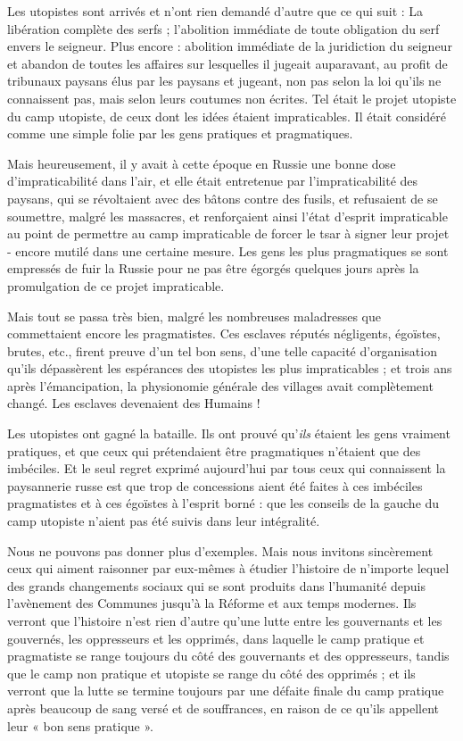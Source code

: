 Les utopistes sont arrivés et n'ont rien demandé d'autre que ce qui suit : La libération complète des serfs ; l'abolition immédiate de toute obligation du serf envers le seigneur. Plus encore : abolition immédiate de la juridiction du seigneur et abandon de toutes les affaires sur lesquelles il jugeait auparavant, au profit de tribunaux paysans élus par les paysans et jugeant, non pas selon la loi qu'ils ne connaissent pas, mais selon leurs coutumes non écrites. Tel était le projet utopiste du camp utopiste, de ceux dont les idées étaient impraticables. Il était considéré comme une simple folie par les gens pratiques et pragmatiques.

Mais heureusement, il y avait à cette époque en Russie une bonne dose d'impraticabilité dans l'air, et elle était entretenue par l'impraticabilité des paysans, qui se révoltaient avec des bâtons contre des fusils, et refusaient de se soumettre, malgré les massacres, et renforçaient ainsi l'état d'esprit impraticable au point de permettre au camp impraticable de forcer le tsar à signer leur projet - encore mutilé dans une certaine mesure. Les gens les plus pragmatiques se sont empressés de fuir la Russie pour ne pas être égorgés quelques jours après la promulgation de ce projet impraticable.

Mais tout se passa très bien, malgré les nombreuses maladresses que commettaient encore les pragmatistes. Ces esclaves réputés négligents, égoïstes, brutes, etc., firent preuve d'un tel bon sens, d'une telle capacité d'organisation qu'ils dépassèrent les espérances des utopistes les plus impraticables ; et trois ans après l'émancipation, la physionomie générale des villages avait complètement changé. Les esclaves devenaient des Humains !

Les utopistes ont gagné la bataille. Ils ont prouvé qu'\emph{ils} étaient les gens vraiment pratiques, et que ceux qui prétendaient être pragmatiques n’étaient que des imbéciles. Et le seul regret exprimé aujourd'hui par tous ceux qui connaissent la paysannerie russe est que trop de concessions aient été faites à ces imbéciles pragmatistes et à ces égoïstes à l’esprit borné : que les conseils de la gauche du camp utopiste n'aient pas été suivis dans leur intégralité.

Nous ne pouvons pas donner plus d'exemples. Mais nous invitons sincèrement ceux qui aiment raisonner par eux-mêmes à étudier l'histoire de n'importe lequel des grands changements sociaux qui se sont produits dans l'humanité depuis l'avènement des Communes jusqu'à la Réforme et aux temps modernes. Ils verront que l'histoire n'est rien d'autre qu'une lutte entre les gouvernants et les gouvernés, les oppresseurs et les opprimés, dans laquelle le camp pratique et pragmatiste se range toujours du côté des gouvernants et des oppresseurs, tandis que le camp non pratique et utopiste se range du côté des opprimés ; et ils verront que la lutte se termine toujours par une défaite finale du camp pratique après beaucoup de sang versé et de souffrances, en raison de ce qu'ils appellent leur « bon sens pratique ».

